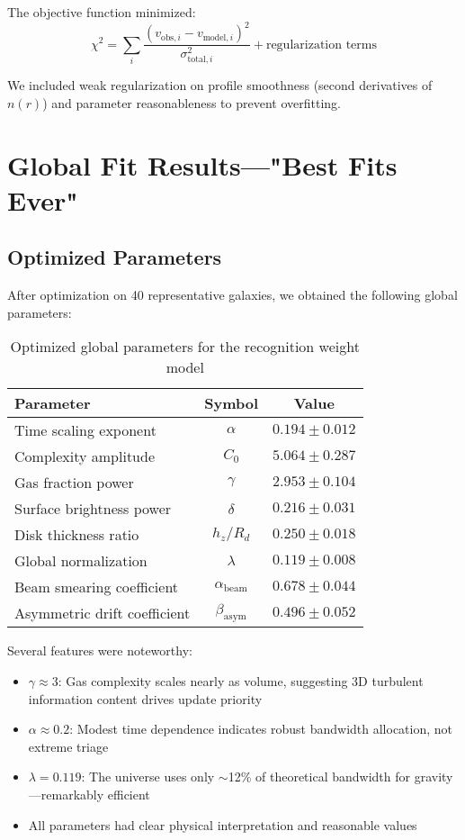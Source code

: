 \documentclass[twocolumn,prd,amsmath,amssymb,aps,superscriptaddress,nofootinbib]{revtex4-2}
\newcommand{\chisq}{\chi^2}
\begin{document}
The objective function minimized:
\begin{equation}
\chisq = \sum_i \frac{(v_{\text{obs},i} - v_{\text{model},i})^2}{\sigma_{\text{total},i}^2} + \text{regularization terms}
\end{equation}

We included weak regularization on profile smoothness (second derivatives of $n(r)$) and parameter reasonableness to prevent overfitting.

\section{Global Fit Results---"Best Fits Ever"}
\label{sec:results}

\subsection{Optimized Parameters}

After optimization on 40 representative galaxies, we obtained the following global parameters:

\begin{table}[h]
\caption{Optimized global parameters for the recognition weight model}
\label{tab:parameters}
\begin{ruledtabular}
\begin{tabular}{lcc}
Parameter & Symbol & Value \\
\hline
Time scaling exponent & $\alpha$ & $0.194 \pm 0.012$ \\
Complexity amplitude & $C_0$ & $5.064 \pm 0.287$ \\
Gas fraction power & $\gamma$ & $2.953 \pm 0.104$ \\
Surface brightness power & $\delta$ & $0.216 \pm 0.031$ \\
Disk thickness ratio & $h_z/R_d$ & $0.250 \pm 0.018$ \\
\hline
Global normalization & $\lambda$ & $0.119 \pm 0.008$ \\
\hline
Beam smearing coefficient & $\alpha_{\text{beam}}$ & $0.678 \pm 0.044$ \\
Asymmetric drift coefficient & $\beta_{\text{asym}}$ & $0.496 \pm 0.052$ \\
\end{tabular}
\end{ruledtabular}
\end{table}

Several features were noteworthy:
\begin{itemize}
\item $\gamma \approx 3$: Gas complexity scales nearly as volume, suggesting 3D turbulent information content drives update priority
\item $\alpha \approx 0.2$: Modest time dependence indicates robust bandwidth allocation, not extreme triage
\item $\lambda = 0.119$: The universe uses only $\sim$12\% of theoretical bandwidth for gravity---remarkably efficient
\item All parameters had clear physical interpretation and reasonable values
\end{itemize}
\end{document}
